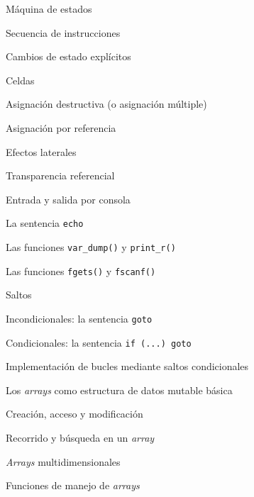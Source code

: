 \begin{longenum}
\begin{longenum}
\begin{longenum}
            \item Máquina de estados
            \item Secuencia de instrucciones
        \end{longenum}
        \item Cambios de estado explícitos
        \begin{longenum}
            \item Celdas
            \item Asignación destructiva (o asignación múltiple)
            \item Asignación por referencia
        \end{longenum}
        \item Efectos laterales
        \begin{longenum}
            \item Transparencia referencial
            \item Entrada y salida por consola
            \begin{longenum}
                \item La sentencia \texttt{echo}
                \item Las funciones \texttt{var\_dump()} y \texttt{print\_r()}
                \item Las funciones \texttt{fgets()} y \texttt{fscanf()}
            \end{longenum}
        \end{longenum}
        \item Saltos
        \begin{longenum}
            \item Incondicionales: la sentencia \texttt{goto}
            \item Condicionales: la sentencia \texttt{if (...) goto}
            \item Implementación de bucles mediante saltos condicionales
        \end{longenum}
        \item Los \textit{arrays} como estructura de datos mutable básica
        \begin{longenum}
            \item Creación, acceso y modificación
            \item Recorrido y búsqueda en un \textit{array}
            \item \textit{Arrays} multidimensionales
            \item Funciones de manejo de \textit{arrays}
        \end{longenum}

\end{longenum}
\end{longenum}
